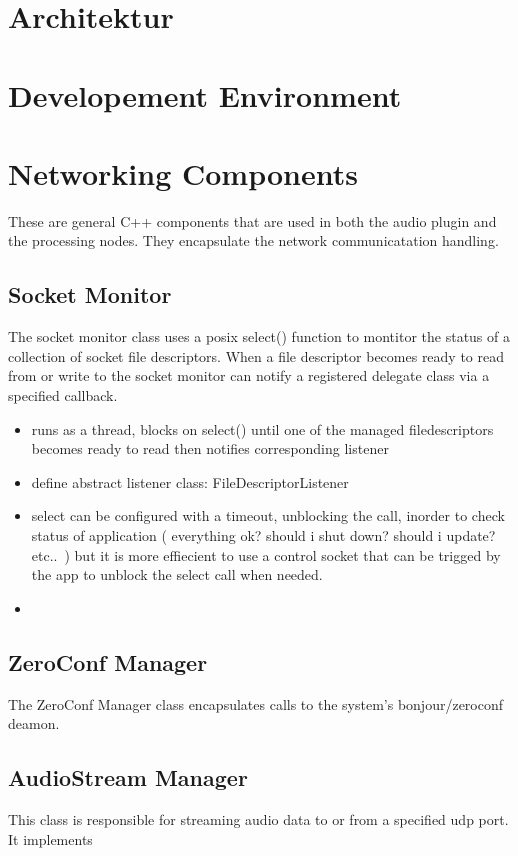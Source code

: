 \section{Architektur}

\section{Developement Environment}

\section{Networking Components}

These are general C++ components that are used in both the audio plugin and the processing nodes. They encapsulate the network communicatation handling.

\subsection{Socket Monitor}

The socket monitor class uses a posix select() function to montitor the status of a collection of socket file descriptors. When a file descriptor becomes ready to read from or write to the socket monitor can notify a registered delegate class via a specified callback.

\begin{itemize}

\item runs as a thread, blocks on select() until one of the managed filedescriptors becomes ready to read then notifies corresponding listener

\item define abstract listener class: FileDescriptorListener
\item select can be configured with a timeout, unblocking the call, inorder to check status of application ( everything ok? should i shut down? should i update? etc.. ) but it is more effiecient to use a control socket that can be trigged by the app to unblock the select call when needed.
\item


\end{itemize}

\subsection{ZeroConf Manager}

The ZeroConf Manager class encapsulates calls to the system's bonjour/zeroconf deamon.

\subsection{AudioStream Manager}

This class is responsible for streaming audio data to or from a specified udp port. It implements